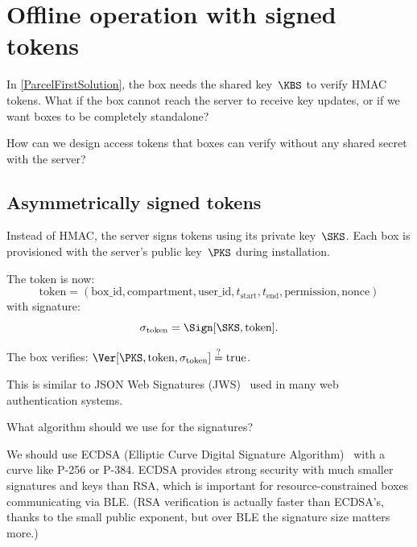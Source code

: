\section{Offline operation with signed tokens}\label{OfflineOperation}


In \cref{ParcelFirstSolution}, the box needs the shared key~\(\KBS\) to
verify HMAC tokens.
What if the box cannot reach the server to receive key updates, or if we
want boxes to be completely standalone?

\begin{exercise}
  How can we design access tokens that boxes can verify without any
  shared secret with the server?
\end{exercise}

\subsection{Asymmetrically signed tokens}

Instead of HMAC, the server signs tokens using its private key~\(\SKS\).
Each box is provisioned with the server's public key~\(\PKS\) during
installation.

The token is now:
\[
  \text{token} = (\text{box\_id}, \text{compartment}, \text{user\_id},
  t_{\text{start}}, t_{\text{end}}, \text{permission}, \text{nonce})
\]
with signature:
\[
  \sigma_{\text{token}} = \Sign[\SKS, \text{token}].
\]

The box verifies: \(\Ver[\PKS, \text{token}, \sigma_{\text{token}}]
\stackrel{?}{=} \text{true}\).

This is similar to JSON Web Signatures (JWS)~\autocite{RFC7515} used in
many web authentication systems.

\begin{exercise}
  What algorithm should we use for the signatures?
\end{exercise}

We should use ECDSA (Elliptic Curve Digital Signature
Algorithm)~\autocite{FIPS186-5} with a curve like P-256 or P-384.
ECDSA provides strong security with much smaller signatures and keys than
RSA, which is important for resource-constrained boxes communicating via
BLE\@.
(RSA verification is actually faster than ECDSA's, thanks to the small
public exponent, but over BLE the signature size matters more.)

